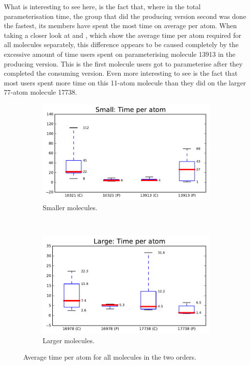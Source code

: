 What is interesting to see here, is the fact that, where in the total parameterisation time, the group that did the producing version second was done the fastest, its members have spent the most time on average per atom. When taking a closer look at  and , which show the average time per atom required for all molecules separately, this difference appears to be caused completely by the excessive amount of time users spent on parameterising molecule 13913 in the producing version. This is the first molecule users got to parameterise after they completed the consuming version. Even more interesting to see is the fact that most users spent more time on this 11-atom molecule than they did on the larger 77-atom molecule 17738.

\begin{figure}
\centering
\begin{subfigure}[t]{0.48\textwidth}
\centering
\includegraphics[width=\textwidth]{img/graphs/1c_03.pdf}
\caption{Smaller molecules.}
\end{subfigure}%
~
\begin{subfigure}[t]{0.48\textwidth}
\centering
\includegraphics[width=\textwidth]{img/graphs/1d_03.pdf}
\caption{Larger molecules.}
\end{subfigure}
\caption{Average time per atom for all molecules in the two orders.}
\end{figure}

